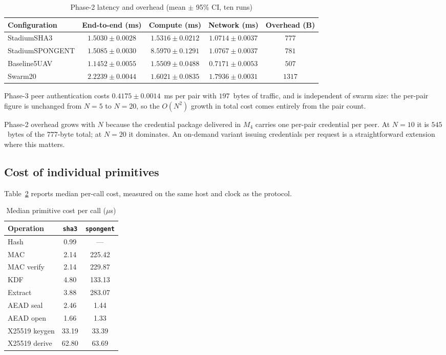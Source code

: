 \documentclass[11pt,a4paper]{article}
\begin{document}
\begin{table}[H]
\centering
\caption{Phase-2 latency and overhead (mean $\pm$ 95\% CI, ten runs)}
\label{tab:latency}
\small
\begin{tabular}{@{}lcccc@{}}
\toprule
\textbf{Configuration} & \textbf{End-to-end (ms)} & \textbf{Compute (ms)} &
\textbf{Network (ms)} & \textbf{Overhead (B)} \\
\midrule
StadiumSHA3     & $1.5030 \pm 0.0028$ & $1.5316 \pm 0.0212$ & $1.0714 \pm 0.0037$ & $777$ \\
StadiumSPONGENT & $1.5085 \pm 0.0030$ & $8.5970 \pm 0.1291$ & $1.0767 \pm 0.0037$ & $781$ \\
Baseline5UAV    & $1.1452 \pm 0.0055$ & $1.5509 \pm 0.0488$ & $0.7171 \pm 0.0053$ & $507$ \\
Swarm20         & $2.2239 \pm 0.0044$ & $1.6021 \pm 0.0835$ & $1.7936 \pm 0.0031$ & $1317$ \\
\bottomrule
\end{tabular}
\end{table}

Phase-3 peer authentication costs $0.4175 \pm 0.0014$~ms per pair with $197$~bytes
of traffic, and is independent of swarm size: the per-pair figure is unchanged from
$N=5$ to $N=20$, so the $O(N^2)$ growth in total cost comes entirely from the pair
count.

Phase-2 overhead grows with $N$ because the credential package delivered in $M_4$
carries one per-pair credential per peer. At $N=10$ it is $545$~bytes of the
$777$-byte total; at $N=20$ it dominates. An on-demand variant issuing credentials
per request is a straightforward extension where this matters.

\subsection{Cost of individual primitives}

Table~\ref{tab:primitives} reports median per-call cost, measured on the same host
and clock as the protocol.

\begin{table}[H]
\centering
\caption{Median primitive cost per call ($\mu$s)}
\label{tab:primitives}
\small
\begin{tabular}{@{}lcc@{}}
\toprule
\textbf{Operation} & \textbf{\texttt{sha3}} & \textbf{\texttt{spongent}} \\
\midrule
Hash & 0.99 & --- \\
MAC & 2.14 & 225.42 \\
MAC verify & 2.14 & 229.87 \\
KDF & 4.80 & 133.13 \\
Extract & 3.88 & 283.07 \\
AEAD seal & 2.46 & 1.44 \\
AEAD open & 1.66 & 1.33 \\
X25519 keygen & 33.19 & 33.39 \\
X25519 derive & 62.80 & 63.69 \\
\bottomrule
\end{tabular}
\end{table}
\end{document}
